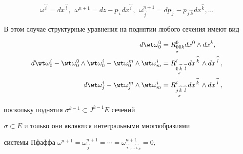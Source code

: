 $$


\omega^{\overset{\frown}{i}{}}


=dx^{\overset{\frown}{i}{}},\ \


\omega^{n+1}=dz-p_{\overset{\frown}{i}{}}


dx^{\overset{\frown}{i}{}},\ \ 


\omega_{\overset{\frown}{j}{}}


^{n+1}=dp_{\overset{\frown}{j}{}}


-p_{\overset{\frown}{j}{}\overset{\frown}{k}{}}


dx^{\overset{\frown}{k}{}}, \dotsc 


$$


В этом случае структурные уравнения на поднятии любого сечения имеют вид


\begin{align*}


d\wt \omega_0^0 &=R_{\underset{\sigma}{0}{}0k}^0 dx^0 \wedge dx^k, \\


%


d\wt \omega_0^i-\wt \omega_0^0 \wedge \wt \omega_0^i-\wt \omega_0^m


\wedge \wt \omega_m^i &=


R_{\underset{\sigma}{0\overset{\frown}{k}{}}\overset{\frown}{l}{}}^i


dx^{\overset{\frown}{k}{}}


\wedge dx^{\overset{\frown}{l}{}}, \\


%


d\wt \omega_j^i-\wt \omega_j^m \wedge \wt \omega_m^i &=


R_{\underset{\sigma}{j\overset{\frown}{k}{}}\overset{\frown}{l}{}}^i


dx^{\overset{\frown}{k}{}}


\wedge dx^{\overset{\frown}{l}{}},


\end{align*} 


поскольку поднятия $\sigma^{k-1} \subset J^{k-1} E$ сечений


$\sigma \subset E$ и только они являются интегральными многообразиями 


системы Пфаффа $\omega^{n+1}=


\omega_{\overset{\frown}{j}{}}


^{n+1}=\dotsb=\omega_{\overset{\frown}{i}{}


_1 \dotsc \overset{\frown}{i}{}_k}^{n+1}=0$,


